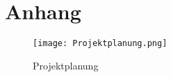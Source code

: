 \section{Anhang}

\begin{figure}[h] 
\centering
\texttt{[image: Projektplanung.png]}%
\caption{Projektplanung}%
\label{fig::Projektplanung_1}%
\end{figure}
